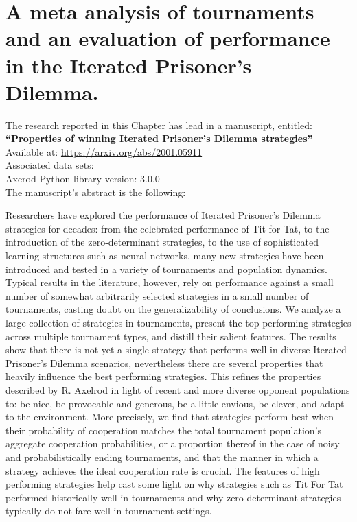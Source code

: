 \chapter{A meta analysis of tournaments and an evaluation of performance in the
Iterated Prisoner's Dilemma.}\label{chapter:meta_tournaments}

\begin{center}
    The research reported in this Chapter has lead in a manuscript, entitled: \\
    \textbf{``Properties of winning Iterated Prisoner's Dilemma strategies''} \\
    Available at: \url{https://arxiv.org/abs/2001.05911} \\
    Associated data sets: \cite{Glynatsi2019_meta, Glynatsi2019_meta_raw_data} \\
    Axerod-Python library version: 3.0.0 \\ \vspace{.5cm}
    The manuscript's abstract is the following:
\end{center}

Researchers have explored the performance of Iterated Prisoner's Dilemma strategies
for decades: from the celebrated performance of Tit for Tat, to the
introduction of the zero-determinant strategies, to the use of sophisticated learning
structures such as neural networks, many new strategies have been introduced and tested
in a variety of tournaments and population dynamics. Typical results in the literature,
however, rely on performance against a small number of somewhat arbitrarily selected
strategies in a small number of tournaments, casting doubt on the generalizability
of conclusions. We analyze a large collection of \numberofstrategies
strategies in \numberofalltournaments tournaments, present the top performing strategies across multiple
tournament types, and distill their salient features.
The results show that there is not yet a single
strategy that performs well in diverse Iterated Prisoner's Dilemma scenarios,
nevertheless there are several properties that heavily influence the best performing
strategies. This refines the properties described by R. Axelrod in light of
recent and more diverse opponent populations to: be nice, be provocable and generous,
be a little envious, be clever, and adapt to the environment. More precisely,
we find that strategies perform best when their probability of cooperation
matches the total tournament population's aggregate cooperation probabilities,
or a proportion thereof in the case of noisy and probabilistically ending tournaments,
and that the manner in which a strategy achieves the ideal cooperation rate is crucial.
The features of high performing strategies help cast some light on why strategies such as Tit For Tat
performed historically well in tournaments and why zero-determinant strategies
typically do not fare well in tournament settings.

